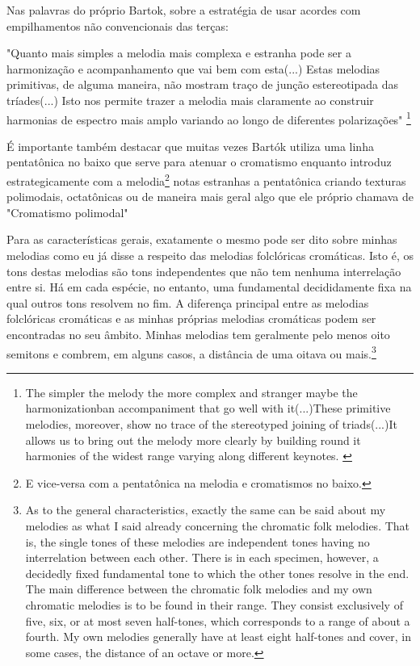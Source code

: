 \documentclass[
	12pt,				%
	openright,			%
	twoside,			%
	a4paper,			%
	english,			%
	french,				%
	spanish,			%
	brazil				%
	]{abntex2}
\begin{document}
Nas palavras do próprio Bartok, sobre a estratégia de usar acordes com empilhamentos não convencionais das terças:

\begin{citacao}
"Quanto mais simples a melodia mais complexa e estranha pode ser a harmonização e acompanhamento que vai bem com esta(...) Estas melodias primitivas, de alguma maneira, não mostram traço de junção estereotipada das tríades(...) Isto nos permite trazer a melodia mais claramente ao construir harmonias de espectro mais amplo variando ao longo de diferentes polarizações"
\cite[p. 342]{bartok1993bela}\footnote{The simpler the melody the more complex and stranger maybe the harmonizationban accompaniment that go well with it(...)These primitive melodies, moreover, show no trace of the stereotyped joining of triads(...)It allows us to bring out the melody more clearly by building round it harmonies of the widest range varying along different keynotes. \cite[p. 342]{bartok1993bela}}
\end{citacao}


É importante também destacar que muitas vezes Bartók utiliza uma linha pentatônica no baixo que serve para atenuar o cromatismo enquanto introduz estrategicamente com a melodia\footnote{E vice-versa com a pentatônica na melodia e cromatismos no baixo.} notas estranhas a pentatônica criando texturas polimodais, octatônicas ou de maneira mais geral algo que ele próprio chamava de "Cromatismo polimodal"\cite{antokoletz1984music}


\begin{citacao}
Para as características gerais, exatamente o mesmo pode ser dito sobre minhas melodias como eu já disse a respeito das melodias folclóricas cromáticas. Isto é, os tons destas melodias são tons independentes que não tem nenhuma interrelação entre si. Há em cada espécie, no entanto, uma fundamental decididamente fixa na qual outros tons resolvem no fim. A diferença principal entre as melodias folclóricas cromáticas e as minhas próprias melodias cromáticas podem ser encontradas no seu âmbito. Minhas melodias tem geralmente pelo menos oito semitons e combrem, em alguns casos, a distância de uma oitava ou mais.\cite[p. 381]{bartok1993bela}\footnote{
As to the general characteristics, exactly the same can be said about my melodies as what I said already concerning the chromatic folk melodies. That is, the single tones of these melodies are independent tones having no interrelation between each other. There is in each specimen, however, a decidedly fixed fundamental tone to which the other tones resolve in the end. The main difference between the chromatic folk melodies and my own chromatic melodies is to be found in their range. They consist exclusively of five, six, or at most seven half-tones, which corresponds to a range of about a fourth. My own melodies generally have at least eight half-tones and cover, in some cases, the distance of an octave or more.\cite[p. 381]{bartok1993bela}}
\end{citacao}
\end{document}
